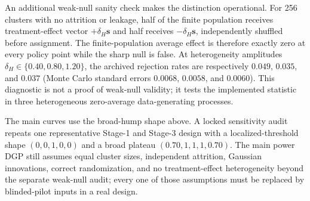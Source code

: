 \documentclass[10pt,a4paper]{article}
\begin{document}
\begin{appendices}
An additional weak-null sanity check makes the distinction operational. For 256 clusters with no attrition or leakage, half of the finite population receives treatment-effect vector $+\delta_H\bm s$ and half receives $-\delta_H\bm s$, independently shuffled before assignment. The finite-population average effect is therefore exactly zero at every policy point while the sharp null is false. At heterogeneity amplitudes $\delta_H\in\{0.40,0.80,1.20\}$, the archived rejection rates are respectively $0.049$, $0.035$, and $0.037$ (Monte Carlo standard errors $0.0068$, $0.0058$, and $0.0060$). This diagnostic is not a proof of weak-null validity; it tests the implemented statistic in three heterogeneous zero-average data-generating processes.

The main curves use the broad-hump shape above. A locked sensitivity audit repeats one representative Stage-1 and Stage-3 design with a localized-threshold shape $(0,0,1,0,0)$ and a broad plateau $(0.70,1,1,1,0.70)$. The main power DGP still assumes equal cluster sizes, independent attrition, Gaussian innovations, correct randomization, and no treatment-effect heterogeneity beyond the separate weak-null audit; every one of those assumptions must be replaced by blinded-pilot inputs in a real design.

\end{appendices}
\end{document}
